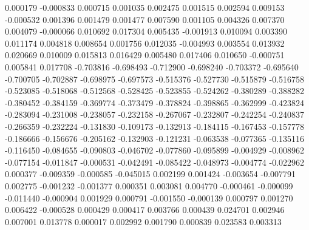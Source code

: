 0.000179
-0.000833
0.000715
0.001035
0.002475
0.001515
0.002594
0.009153
-0.000532
0.001396
0.001479
0.001477
0.007590
0.001105
0.004326
0.007370
0.004079
-0.000066
0.010692
0.017304
0.005435
-0.001913
0.010094
0.003390
0.011174
0.004818
0.008654
0.001756
0.012035
-0.004993
0.003554
0.013932
0.020669
0.010009
0.015813
0.016429
0.005480
0.017406
0.010650
-0.000751
0.005841
0.017708
-0.703816
-0.698493
-0.712900
-0.698240
-0.703372
-0.695640
-0.700705
-0.702887
-0.698975
-0.697573
-0.515376
-0.527730
-0.515879
-0.516758
-0.523085
-0.518068
-0.512568
-0.528425
-0.523855
-0.524262
-0.380289
-0.388282
-0.380452
-0.384159
-0.369774
-0.373479
-0.378824
-0.398865
-0.362999
-0.423824
-0.283094
-0.231008
-0.238057
-0.232158
-0.267067
-0.232807
-0.242254
-0.240837
-0.266359
-0.232224
-0.131830
-0.109173
-0.132913
-0.184115
-0.167453
-0.157778
-0.186666
-0.156676
-0.205162
-0.132903
-0.121231
-0.063538
-0.077365
-0.135116
-0.116450
-0.084655
-0.090803
-0.046702
-0.077860
-0.095899
-0.004929
-0.008962
-0.077154
-0.011847
-0.000531
-0.042491
-0.085422
-0.048973
-0.004774
-0.022962
0.000377
-0.009359
-0.000585
-0.045015
0.002199
0.001424
-0.003654
-0.007791
0.002775
-0.001232
-0.001377
0.000351
0.003081
0.004770
-0.000461
-0.000099
-0.011440
-0.000904
0.001929
0.000791
-0.001550
-0.000139
0.000797
0.001270
0.006422
-0.000528
0.000429
0.000417
0.003766
0.000439
0.024701
0.002946
0.007001
0.013778
0.000017
0.002992
0.001790
0.000839
0.023583
0.003313

